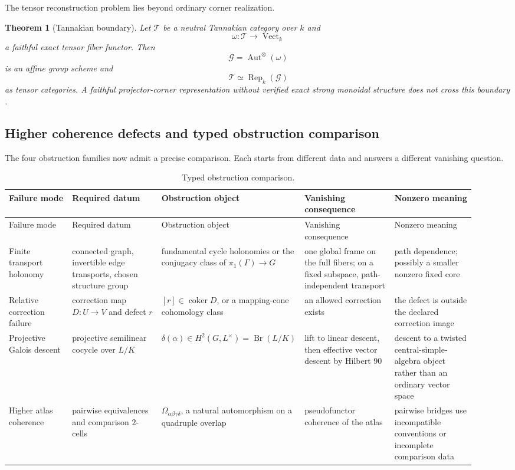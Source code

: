 \documentclass[11pt]{article}
\newtheorem{theorem}{Theorem}[section]
\theoremstyle{definition}
\theoremstyle{remark}
\DeclareMathOperator{\coker}{coker}
\DeclareMathOperator{\Aut}{Aut}
\DeclareMathOperator{\Br}{Br}
\begin{document}
The tensor reconstruction problem lies beyond ordinary corner realization.

\begin{theorem}[Tannakian boundary]
\label{thm:block02-tannakian-boundary}
Let \(\mathcal T\) be a neutral Tannakian category over \(k\) and
\[
\omega:\mathcal T\longrightarrow\operatorname{Vect}_k
\]
a faithful exact tensor fiber functor.  Then
\[
\mathcal G=\Aut^{\otimes}(\omega)
\]
is an affine group scheme and
\[
\mathcal T\simeq\operatorname{Rep}_k(\mathcal G)
\]
as tensor categories.  A faithful projector-corner representation without verified exact strong monoidal structure does not cross this boundary \cite{GAL,RT}.
\end{theorem}

\subsection{Higher coherence defects and typed obstruction comparison}
\label{subsec:obstruction-comparison}

The four obstruction families now admit a precise comparison.  Each starts from different data and answers a different vanishing question.

\begin{landscape}
\small
\begin{longtable}{@{}L{0.14\linewidth}L{0.20\linewidth}L{0.20\linewidth}L{0.20\linewidth}L{0.18\linewidth}@{}}
\caption{Typed obstruction comparison.}
\label{tab:obstruction-comparison}\\
\toprule
Failure mode & Required datum & Obstruction object & Vanishing consequence & Nonzero meaning\\
\midrule
\endfirsthead
\toprule
Failure mode & Required datum & Obstruction object & Vanishing consequence & Nonzero meaning\\
\midrule
\endhead
Finite transport holonomy & connected graph, invertible edge transports, chosen structure group & fundamental cycle holonomies or the conjugacy class of \(\pi_1(\Gamma)\to G\) & one global frame on the full fibers; on a fixed subspace, path-independent transport & path dependence; possibly a smaller nonzero fixed core\\
Relative correction failure & correction map \(D:U\to V\) and defect \(r\) & \([r]\in\coker D\), or a mapping-cone cohomology class & an allowed correction exists & the defect is outside the declared correction image\\
Projective Galois descent & projective semilinear cocycle over \(L/K\) & \(\delta(\alpha)\in H^2(G,L^\times)=\Br(L/K)\) & lift to linear descent, then effective vector descent by Hilbert 90 & descent to a twisted central-simple-algebra object rather than an ordinary vector space\\
Higher atlas coherence & pairwise equivalences and comparison \(2\)-cells & \(\Omega_{\alpha\beta\gamma\delta}\), a natural automorphism on a quadruple overlap & pseudofunctor coherence of the atlas & pairwise bridges use incompatible conventions or incomplete comparison data\\
\bottomrule
\end{longtable}
\end{landscape}
\end{document}
